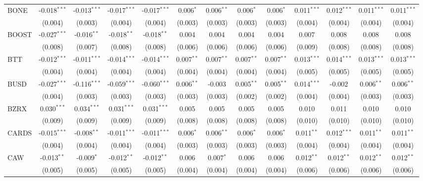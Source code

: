 \begin{table}[!htbp]
\begin{tabular}{@{\extracolsep{5pt}}lcccccccccccc}
 BONE & -0.018$^{***}$ & -0.013$^{***}$ & -0.017$^{***}$ & -0.017$^{***}$ & 0.006$^{*}$ & 0.006$^{**}$ & 0.006$^{*}$ & 0.006$^{*}$ & 0.011$^{***}$ & 0.012$^{***}$ & 0.011$^{***}$ & 0.011$^{***}$ \\
  & (0.004) & (0.003) & (0.004) & (0.004) & (0.003) & (0.003) & (0.003) & (0.003) & (0.004) & (0.004) & (0.004) & (0.004) \\
 BOOST & -0.027$^{***}$ & -0.016$^{**}$ & -0.018$^{**}$ & -0.018$^{**}$ & 0.004$^{}$ & 0.004$^{}$ & 0.004$^{}$ & 0.004$^{}$ & 0.007$^{}$ & 0.008$^{}$ & 0.008$^{}$ & 0.008$^{}$ \\
  & (0.008) & (0.007) & (0.008) & (0.008) & (0.006) & (0.006) & (0.006) & (0.006) & (0.009) & (0.008) & (0.008) & (0.008) \\
 BTT & -0.012$^{***}$ & -0.011$^{***}$ & -0.014$^{***}$ & -0.014$^{***}$ & 0.007$^{**}$ & 0.007$^{**}$ & 0.007$^{**}$ & 0.007$^{**}$ & 0.013$^{***}$ & 0.014$^{***}$ & 0.013$^{***}$ & 0.013$^{***}$ \\
  & (0.004) & (0.004) & (0.004) & (0.004) & (0.004) & (0.004) & (0.004) & (0.004) & (0.005) & (0.005) & (0.005) & (0.005) \\
 BUSD & -0.027$^{***}$ & -0.116$^{***}$ & -0.059$^{***}$ & -0.060$^{***}$ & 0.006$^{**}$ & -0.003$^{}$ & 0.005$^{**}$ & 0.005$^{**}$ & 0.014$^{***}$ & -0.002$^{}$ & 0.006$^{**}$ & 0.006$^{**}$ \\
  & (0.004) & (0.003) & (0.003) & (0.003) & (0.003) & (0.003) & (0.002) & (0.002) & (0.004) & (0.004) & (0.003) & (0.003) \\
 BZRX & 0.030$^{***}$ & 0.034$^{***}$ & 0.031$^{***}$ & 0.031$^{***}$ & 0.005$^{}$ & 0.005$^{}$ & 0.005$^{}$ & 0.005$^{}$ & 0.010$^{}$ & 0.011$^{}$ & 0.010$^{}$ & 0.010$^{}$ \\
  & (0.009) & (0.009) & (0.009) & (0.009) & (0.008) & (0.008) & (0.008) & (0.008) & (0.010) & (0.010) & (0.010) & (0.010) \\
 CARDS & -0.015$^{***}$ & -0.008$^{**}$ & -0.011$^{***}$ & -0.011$^{***}$ & 0.006$^{*}$ & 0.006$^{**}$ & 0.006$^{*}$ & 0.006$^{*}$ & 0.011$^{**}$ & 0.012$^{***}$ & 0.011$^{**}$ & 0.011$^{**}$ \\
  & (0.004) & (0.004) & (0.004) & (0.004) & (0.003) & (0.003) & (0.003) & (0.003) & (0.004) & (0.004) & (0.004) & (0.004) \\
 CAW & -0.013$^{**}$ & -0.009$^{*}$ & -0.012$^{**}$ & -0.012$^{**}$ & 0.006$^{}$ & 0.007$^{*}$ & 0.006$^{}$ & 0.006$^{}$ & 0.012$^{**}$ & 0.012$^{**}$ & 0.012$^{**}$ & 0.012$^{**}$ \\
  & (0.005) & (0.005) & (0.005) & (0.005) & (0.004) & (0.004) & (0.004) & (0.004) & (0.006) & (0.006) & (0.006) & (0.006) \\

\end{tabular}
\end{table}
